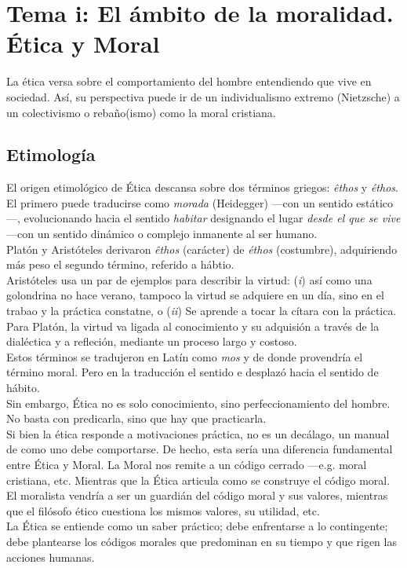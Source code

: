\documentclass[11pt]{article}
\author{Jordi}
\date{\today}
\title{}
\begin{document}
\tableofcontents

\section{Tema i: El ámbito de la moralidad. Ética y Moral}
\label{sec:orgd78f952}
La ética versa sobre el comportamiento del hombre entendiendo que vive
en sociedad. Así, su perspectiva puede ir de un individualismo extremo
(Nietzsche) a un colectivismo o rebaño(ismo) como la moral cristiana.
\subsection{Etimología}
\label{sec:orga0d6065}
El origen etimológico de Ética descansa sobre dos términos griegos:
\emph{êthos} y \emph{éthos}.  El primero puede traducirse como \emph{morada}
(Heidegger) ---con un sentido estático---, evolucionando hacia el
sentido \emph{habitar} designando el lugar \emph{desde el que se vive} ---con un
sentido dinámico o complejo inmanente al ser humano.\\


Platón y Aristóteles derivaron \emph{êthos} (carácter) de \emph{éthos}
(costumbre), adquiriendo más peso el segundo término, referido a
hábtio.\\
Aristóteles usa un par de ejemplos para describir la virtud: (\emph{i}) así
como una golondrina no hace verano, tampoco la virtud se adquiere en
un día, sino en el trabao y la práctica constatne, o (\emph{ii}) Se aprende
a tocar la cítara con la práctica.\\
Para Platón, la virtud va ligada al conocimiento y su adquisión a
través de la dialéctica y a refleción, mediante un proceso largo y
costoso.\\


Estos términos se tradujeron en Latín como \emph{mos} y de donde provendría
el término moral. Pero en la traducción el sentido e desplazó hacia el
sentido de hábito.\\


Sin embargo, Ética no es solo conocimiento, sino perfeccionamiento del
hombre. No basta con predicarla, sino que hay que practicarla.\\

Si bien la ética responde a motivaciones práctica, no es un decálago,
un manual de como uno debe comportarse. De hecho, esta sería una
diferencia fundamental entre Ética y Moral. La Moral nos remite a un
código cerrado ---e.g. moral cristiana, etc. Mientras que la Ética
articula como se construye el código moral. El moralista vendría a ser
un guardián del código moral y sus valores, mientras que el filósofo
ético cuestiona los mismos valores, su utilidad, etc.\\
La Ética se entiende como un saber práctico; debe enfrentarse a lo
contingente; debe plantearse los códigos morales que predominan en su
tiempo y que rigen las acciones humanas.\\
\end{document}
